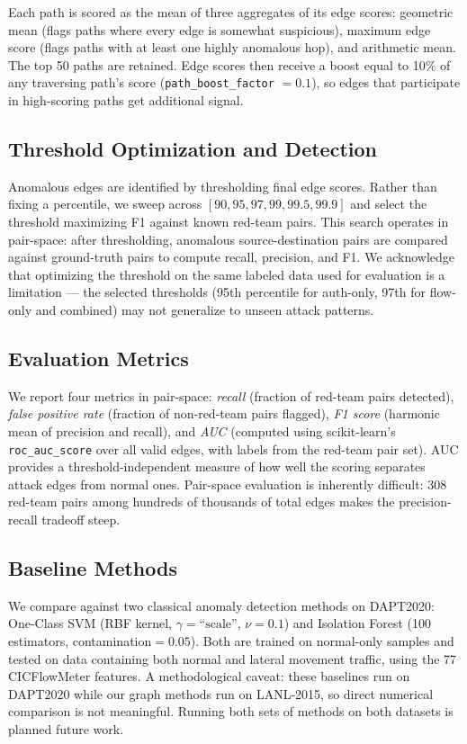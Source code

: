 Each path is scored as the mean of three aggregates of its edge scores: geometric mean (flags paths where every edge is somewhat suspicious), maximum edge score (flags paths with at least one highly anomalous hop), and arithmetic mean. The top 50 paths are retained. Edge scores then receive a boost equal to 10\% of any traversing path's score (\texttt{path\_boost\_factor} $= 0.1$), so edges that participate in high-scoring paths get additional signal.

\subsection{Threshold Optimization and Detection}

Anomalous edges are identified by thresholding final edge scores. Rather than fixing a percentile, we sweep across $[90, 95, 97, 99, 99.5, 99.9]$ and select the threshold maximizing F1 against known red-team pairs. This search operates in pair-space: after thresholding, anomalous source-destination pairs are compared against ground-truth pairs to compute recall, precision, and F1. We acknowledge that optimizing the threshold on the same labeled data used for evaluation is a limitation --- the selected thresholds (95th percentile for auth-only, 97th for flow-only and combined) may not generalize to unseen attack patterns.

\subsection{Evaluation Metrics}

We report four metrics in pair-space: \emph{recall} (fraction of red-team pairs detected), \emph{false positive rate} (fraction of non-red-team pairs flagged), \emph{F1 score} (harmonic mean of precision and recall), and \emph{AUC} (computed using scikit-learn's \texttt{roc\_auc\_score} over all valid edges, with labels from the red-team pair set). AUC provides a threshold-independent measure of how well the scoring separates attack edges from normal ones. Pair-space evaluation is inherently difficult: 308 red-team pairs among hundreds of thousands of total edges makes the precision-recall tradeoff steep.

\subsection{Baseline Methods}

We compare against two classical anomaly detection methods on DAPT2020: One-Class SVM (RBF kernel, $\gamma{=}\text{``scale''}$, $\nu{=}0.1$) and Isolation Forest (100 estimators, contamination$= 0.05$). Both are trained on normal-only samples and tested on data containing both normal and lateral movement traffic, using the 77 CICFlowMeter features. A methodological caveat: these baselines run on DAPT2020 while our graph methods run on LANL-2015, so direct numerical comparison is not meaningful. Running both sets of methods on both datasets is planned future work.

